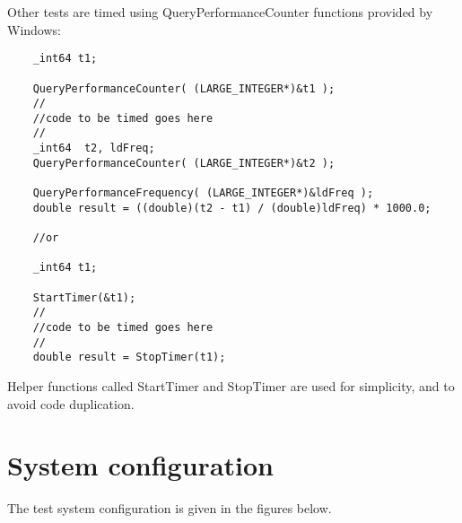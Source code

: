 Other tests are timed using QueryPerformanceCounter functions provided by Windows:
\begin{lstlisting}
	_int64 t1;
	
	QueryPerformanceCounter( (LARGE_INTEGER*)&t1 );
	//
	//code to be timed goes here
	//
	_int64  t2, ldFreq;
	QueryPerformanceCounter( (LARGE_INTEGER*)&t2 );
	
	QueryPerformanceFrequency( (LARGE_INTEGER*)&ldFreq );
	double result = ((double)(t2 - t1) / (double)ldFreq) * 1000.0;
	
	//or
	
	_int64 t1;

	StartTimer(&t1);
	//
	//code to be timed goes here
	//
	double result = StopTimer(t1);
\end{lstlisting}
Helper functions called StartTimer and StopTimer are used for simplicity, and to avoid code duplication.

\section{System configuration}
The test system configuration is given in the figures below.
